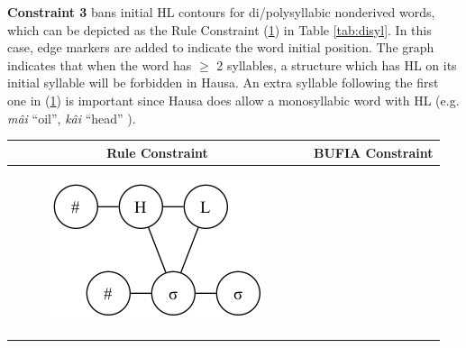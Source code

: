 \documentclass[11pt,letterpaper]{article}
\begin{document}
\textbf{Constraint 3} bans initial HL contours for di/polysyllabic nonderived words, which can be depicted as the Rule Constraint (\ref{cons3a}) in Table \ref{tab:disyl}. In this case, edge markers are added to indicate the word initial position. The graph indicates that when the word has $\geq$ 2 syllables, a structure which has HL on its initial syllable will be forbidden in Hausa. An extra syllable following the first one in (\ref{cons3a}) is important since Hausa does allow a monosyllabic word with HL (e.g. \textit{mâi} ``oil'', \textit{kâi} ``head'' ). 

\begin{table}[ht]	
	\centering
	\begin{tabular}{c|c}
		\hline
		Rule Constraint & 	BUFIA Constraint \\
		\hline
		\begin{subfigure}{0.24\textwidth}
			\includegraphics[width=\textwidth]{figs/HLinitial.png}
			\caption{}
			\label{cons3a}
		\end{subfigure} &
		\begin{subfigure}{0.137\textwidth}

\end{subfigure}
\end{tabular}
\end{table}
\end{document}
